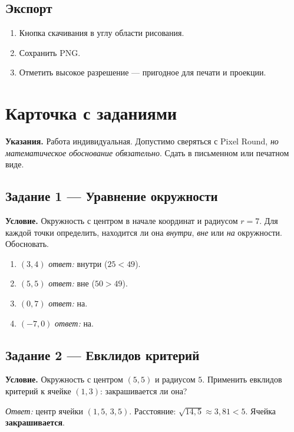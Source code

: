 \documentclass[12pt,a4paper]{scrartcl}
\newcommand{\acc}[1]{\textcolor{accent}{\textbf{#1}}}
\begin{document}
\subsection{Экспорт}
\begin{enumerate}[leftmargin=1.5em,itemsep=0.15em,topsep=0.3em]
  \item Кнопка скачивания в углу области рисования.
  \item Сохранить PNG.
  \item Отметить высокое разрешение --- пригодное для печати и проекции.
\end{enumerate}

\newpage
\section{Карточка с заданиями}\label{ap:zad}

\textbf{Указания.} Работа индивидуальная. Допустимо сверяться с Pixel Round, \emph{но математическое обоснование обязательно}. Сдать в письменном или печатном виде.

\subsection*{Задание 1 --- Уравнение окружности}
\textbf{Условие.} Окружность с центром в начале координат и радиусом $r = 7$. Для каждой точки определить, находится ли она \emph{внутри}, \emph{вне} или \emph{на} окружности. Обосновать.
\begin{enumerate}[label=\alph*),leftmargin=1.5em,itemsep=0.1em,topsep=0.2em,nosep]
  \item $(3, 4)$ \hfill \emph{ответ:} внутри ($25 < 49$).
  \item $(5, 5)$ \hfill \emph{ответ:} вне ($50 > 49$).
  \item $(0, 7)$ \hfill \emph{ответ:} на.
  \item $(-7, 0)$ \hfill \emph{ответ:} на.
\end{enumerate}

\subsection*{Задание 2 --- Евклидов критерий}
\textbf{Условие.} Окружность с центром $(5, 5)$ и радиусом $5$. Применить евклидов критерий к ячейке $(1, 3)$: закрашивается ли она?

\emph{Ответ:} центр ячейки $(1{,}5,\, 3{,}5)$. Расстояние: $\sqrt{14{,}5} \approx 3{,}81 < 5$. Ячейка \acc{закрашивается}.
\end{document}
